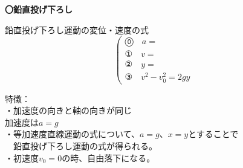 \documentclass[11pt,twoside,fleqn]{article}
\begin{document}
\begin{itembox}[l]{\textbf{〇鉛直投げ下ろし}}
	\begin{minipage}[t]{0.70\linewidth}
		鉛直投げ下ろし運動の変位・速度の式
		\Large
		\[
		\left(
		\begin{array}{ll}
			\text{⓪} \quad a = & \\
			\text{①} \quad v = & \\
			\text{②} \quad y = & \\
			\text{③} \quad v^2 - v_0^2 = 2gy &
		\end{array}
		\right.
		\]
		\normalsize
			\begin{shadebox}
				特徴：\\
				・加速度の向きと軸の向きが同じ\\
				\quad\to 加速度は$a=g$\\
				・等加速度直線運動の式について、$a=g$、$x=y$とすることで\\　鉛直投げ下ろし運動の式が得られる。\\
				・初速度$v_0=0$の時、自由落下になる。
			\end{shadebox}
	\end{minipage}
	\hfill
	\begin{minipage}[t]{0.26\linewidth}
		\begin{center}
		\end{center}
	\end{minipage}
\end{itembox}
\end{document}
